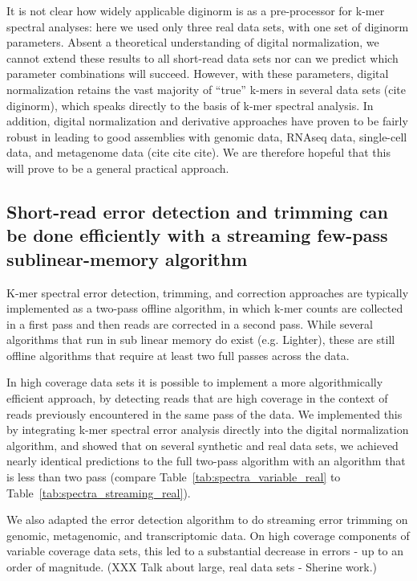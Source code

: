 \documentclass{article}
\begin{document}
It is not clear how widely applicable diginorm is as a pre-processor
for k-mer spectral analyses: here we used only three real data sets,
with one set of diginorm parameters.  Absent a theoretical
understanding of digital normalization, we cannot extend these results
to all short-read data sets nor can we predict which parameter
combinations will succeed.  However, with these parameters, digital
normalization retains the vast majority of ``true'' k-mers in several
data sets (cite diginorm), which speaks directly to the basis of k-mer
spectral analysis.  In addition, digital normalization and derivative
approaches have proven to be fairly robust in leading to good
assemblies with genomic data, RNAseq data, single-cell data, and
metagenome data (cite cite cite).  We are therefore hopeful that this
will prove to be a general practical approach.


\subsection{Short-read error detection and trimming can be done efficiently with a streaming few-pass sublinear-memory algorithm}

K-mer spectral error detection, trimming, and correction approaches
are typically implemented as a two-pass offline algorithm, in which
k-mer counts are collected in a first pass and then reads are
corrected in a second pass.  While several algorithms that run in sub
linear memory do exist (e.g. Lighter), these are still offline
algorithms that require at least two full passes across the data.

In high coverage data sets it is possible to implement a more
algorithmically efficient approach, by detecting reads that are high
coverage in the context of reads previously encountered in the same
pass of the data.  We implemented this by integrating k-mer spectral
error analysis directly into the digital normalization algorithm, and
showed that on several synthetic and real data sets, we achieved
nearly identical predictions to the full two-pass algorithm with an
algorithm that is less than two pass (compare
Table~\ref{tab:spectra_variable_real} to
Table~\ref{tab:spectra_streaming_real}).

We also adapted the error detection algorithm to do streaming error
trimming on genomic, metagenomic, and transcriptomic data.  On high
coverage components of variable coverage data sets, this led to
a substantial decrease in errors - up to an order of magnitude.
(XXX Talk about large, real data sets - Sherine work.)
\end{document}
